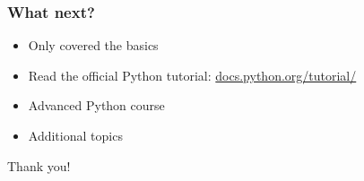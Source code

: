 \documentclass[14pt,compress]{beamer}
\begin{document}
\begin{frame}
  \frametitle{What next?}
  \begin{itemize}
  \item Only covered the basics
  \item Read the official Python tutorial:
    \url{docs.python.org/tutorial/}
  \item Advanced Python course
  \item Additional topics

  \end{itemize}
\end{frame}

\begin{frame}
  \centering
  \Huge

  Thank you!
\end{frame}
\end{document}
